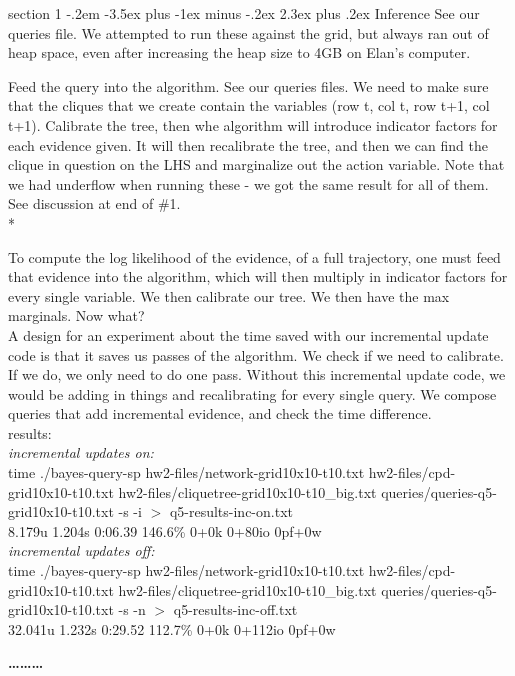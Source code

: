 \documentclass[12pt]{article}
\makeatletter
\newenvironment{problem}{\@startsection
       {section}
       {1}
       {-.2em}
       {-3.5ex plus -1ex minus -.2ex}
       {2.3ex plus .2ex}
       {\pagebreak[3]%
       \large\bf\noindent{Problem }
       }
       }
       {%
       \begin{center}\large\bf \ldots\ldots\ldots\end{center}}
\makeatother
\begin{document}
\begin{problem}{Inference}
See our queries file.  We attempted to run these against the grid, but always ran out of heap space, even after increasing the heap size to 4GB on Elan's computer.

Feed the query into the algorithm.  See our queries files.  We need to make sure that the cliques that we create contain the variables (row t, col t, row t+1, col t+1).  Calibrate the tree, then whe algorithm will introduce indicator factors for each evidence given.  It will then recalibrate the tree, and then we can find the clique in question on the LHS and marginalize out the action variable.  Note that we had underflow when running these - we got the same result for all of them.  See discussion at end of \#1.  \\*

To compute the log likelihood of the evidence, of a full trajectory, one must feed that evidence into the algorithm, which will then multiply in indicator factors for every single variable.  We then calibrate our tree.  We then have the max marginals.  Now what?\\

A design for an experiment about the time saved with our incremental update code is that it saves us passes of the algorithm.  We check if we need to calibrate.  If we do, we only need to do one pass.  Without this incremental update code, we would be adding in things and recalibrating for every single query.  We compose queries that add incremental evidence, and check the time difference.\\
\noindent results:\\
\noindent \textit{incremental updates on:}\\
time ./bayes-query-sp hw2-files/network-grid10x10-t10.txt hw2-files/cpd-grid10x10-t10.txt hw2-files/cliquetree-grid10x10-t10\_big.txt queries/queries-q5-grid10x10-t10.txt -s -i $>$ q5-results-inc-on.txt\\
8.179u 1.204s 0:06.39 146.6\%    0+0k 0+80io 0pf+0w\\
\noindent \textit{incremental updates off:}\\
time ./bayes-query-sp hw2-files/network-grid10x10-t10.txt hw2-files/cpd-grid10x10-t10.txt hw2-files/cliquetree-grid10x10-t10\_big.txt queries/queries-q5-grid10x10-t10.txt -s -n  $>$ q5-results-inc-off.txt\\
32.041u 1.232s 0:29.52 112.7\%   0+0k 0+112io 0pf+0w\\


\end{problem}
\end{document}
